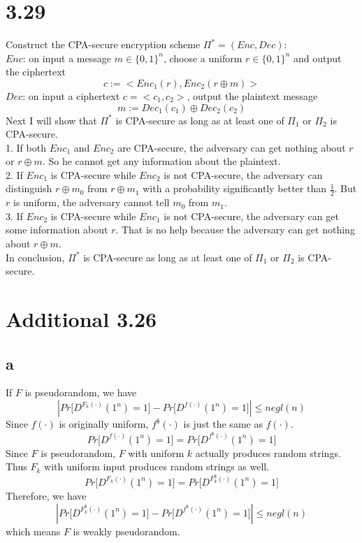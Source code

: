 \documentclass[a4papers]{ctexart}
\begin{document}
\section*{3.29}
\noindent Construct the CPA-secure encryption scheme $\Pi^*=(Enc,Dec)$:\\
$Enc$: on input a message $m \in \{0,1\}^n$, choose a uniform $r\in \{0,1\}^n$ and output the ciphertext
\[ c:= <Enc_1(r),Enc_2(r\oplus m)>\]
$Dec$: on input a ciphertext $c = <c_1,c_2>$, output the plaintext message
\[m:=Dec_1(c_1) \oplus Dec_2(c_2)\]
Next I will show that $\Pi^*$ is CPA-secure as long as at least one of $\Pi_1$ or $\Pi_2$ is CPA-secure.\\
1. If both $Enc_1$ and $Enc_2$ are CPA-secure, the adversary can get nothing about $r$ or $r\oplus m$. So he cannot 
get any information about the plaintext.\\
2. If $Enc_1$ is CPA-secure while $Enc_2$ is not CPA-secure, the adversary can distinguish $r\oplus m_0$ from $r\oplus m_1$ with a probability significantly better than $\frac{1}{2}$.
But $r$ is uniform, the adversary cannot tell $m_0$ from $m_1$.\\
3. If $Enc_2$ is CPA-secure while $Enc_1$ is not CPA-secure, the adversary can get some information about $r$.
That is no help because the adversary can get nothing about $r\oplus m$.\\
In conclusion, $\Pi^*$ is CPA-secure as long as at least one of $\Pi_1$ or $\Pi_2$ is CPA-secure.\\

\section*{Additional 3.26}
\subsection*{a}
\noindent If $F$ is pseudorandom, we have
 \[|Pr\big[ D^{F_k(·)}(1^n)=1\big] - Pr\big[ D^{f(·)}(1^n)=1\big]| \le negl(n)\]
 Since $f(·)$ is originally uniform, $f^\$(·)$ is just the same as $f(·)$.
 \[Pr\big[ D^{f(·)}(1^n)=1\big] = Pr\big[ D^{f^\$(·)}(1^n)=1\big]\]
Since $F$ is pseudorandom, $F$ with uniform $k$ actually produces random strings. Thus $F_k$ with uniform input produces random strings as well.
\[Pr\big[ D^{F_k(·)}(1^n)=1\big] = Pr\big[ D^{F^\$_k(·)}(1^n)=1\big]\]
Therefore, we have 
 \[|Pr\big[ D^{F^\$_k(·)}(1^n)=1\big] - Pr\big[ D^{f^\$(·)}(1^n)=1\big]| \le negl(n)\]
 which means $F$ is weakly pseudorandom.
\end{document}

